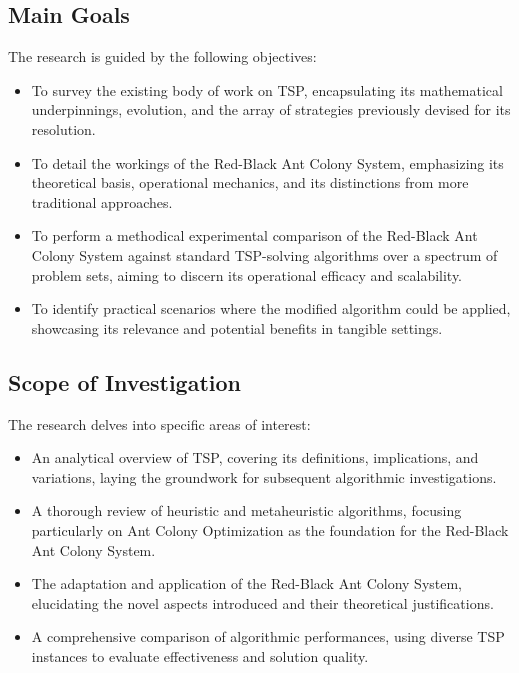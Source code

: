 \subsection{Main Goals}

The research is guided by the following objectives:

\begin{itemize}
	\item To survey the existing body of work on TSP, encapsulating its mathematical underpinnings, evolution, and the array of strategies previously devised for its resolution.
	\item To detail the workings of the Red-Black Ant Colony System, emphasizing its theoretical basis, operational mechanics, and its distinctions from more traditional approaches.
	\item To perform a methodical experimental comparison of the Red-Black Ant Colony System against standard TSP-solving algorithms over a spectrum of problem sets, aiming to discern its operational efficacy and scalability.
	\item To identify practical scenarios where the modified algorithm could be applied, showcasing its relevance and potential benefits in tangible settings.
\end{itemize}

\subsection{Scope of Investigation}

The research delves into specific areas of interest:

\begin{itemize}
	\item An analytical overview of TSP, covering its definitions, implications, and variations, laying the groundwork for subsequent algorithmic investigations.
	\item A thorough review of heuristic and metaheuristic algorithms, focusing particularly on Ant Colony Optimization as the foundation for the Red-Black Ant Colony System.
	\item The adaptation and application of the Red-Black Ant Colony System, elucidating the novel aspects introduced and their theoretical justifications.
	\item A comprehensive comparison of algorithmic performances, using diverse TSP instances to evaluate effectiveness and solution quality.
\end{itemize}

